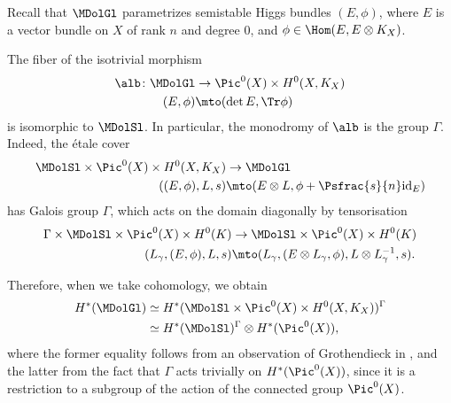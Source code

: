Recall that $\MDolGl$ parametrizes semistable Higgs bundles $(E, \phi)$, where $E$ is a vector bundle on $X$ of rank $n$ and degree $0$, and $\phi \in \Hom(E, E \otimes K_X)$.

The fiber of the isotrivial morphism
\begin{equation}
\begin{aligned}
\alb\colon \MDolGl & \to \Pic^0(X) \times H^0(X, K_X) \label{eq:alb}\\
(E, \phi) & \mto (\det E, \Tr \phi)
\end{aligned}
\end{equation}
is isomorphic to $\MDolSl$. In particular, the monodromy of $\alb$ is the group $\Gamma$. Indeed, the étale cover
\begin{equation}
\begin{aligned}
\MDolSl \times \Pic^0(X) \times H^0(X, K_X) & \to \MDolGl\label{eq:etalecoverMDolSLGL}\\
((E, \phi), L, s) & \mto (E \otimes L, \phi + \Psfrac{s}{n}\mathrm{id}_{E})
\end{aligned}
\end{equation}
has Galois group $\Gamma$, which acts on the domain diagonally by tensorisation
\begin{align*}
\Gamma \times \MDolSl \times \Pic^0(X) \times H^0(K) & \to \MDolSl \times \Pic^0(X) \times H^0(K)\\
(L_{\gamma}, (E, \phi), L, s) & \mto (L_{\gamma}, (E \otimes L_{\gamma}, \phi), L \otimes L^{-1}_{\gamma}, s).
\end{align*}

Therefore, when we take cohomology, we obtain
\begin{equation}
\begin{aligned}
H^*(\MDolGl)& \simeq H^*(\MDolSl \times \Pic^0(X) \times H^0(X, K_X))^{\Gamma} \\
& \simeq H^*(\MDolSl)^{\Gamma} \otimes H^*( \Pic^0(X)), \label{eq:cohomMGLDol}
\end{aligned}
\end{equation}
where the former equality follows from an observation of Grothendieck in \cite{Grothendieck_1957}, and the latter from the fact that $\Gamma$ acts trivially on $H^*(\Pic^0(X))$, since it is a restriction to a subgroup of the action of the connected group $\Pic^0(X)$.

